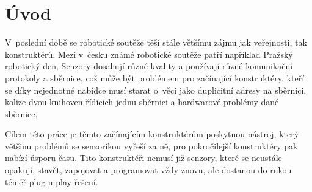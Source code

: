 \chapter*{Úvod}
V~poslední době se robotické soutěže těší stále většímu zájmu jak veřejnosti, tak konstruktérů.
Mezi v~česku známé robotické soutěže patří například Pražský robotický den\cite{Prague_robotic_day}, 
Senzory dosahují různé kvality a používají různé komunikační protokoly a sběrnice, což může být problémem pro začínající konstruktéry, kteří se díky nejednotné nabídce musí starat o~věci jako duplicitní adresy na sběrnici, kolize dvou knihoven řídících jednu sběrnici a hardwarové problémy dané sběrnice.

Cílem této práce je těmto začínajícím konstruktérům poskytnou nástroj, který většinu problémů se senzorikou vyřeší za ně, pro pokročilejší konstruktéry pak nabízí úsporu času.
Tito konstruktéři nemusí již senzory, které se neustále opakují, stavět, zapojovat a programovat vždy znovu, ale dostanou do rukou téměř plug-n-play řešení.


\newpage